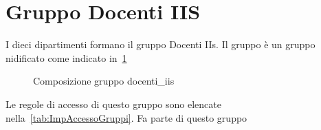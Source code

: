 \section{Gruppo Docenti IIS}
I dieci dipartimenti formano il gruppo Docenti IIs. Il gruppo è un gruppo nidificato come indicato in~\cref{fig:verticalidocenti}
\begin{figure}
	\centering
	
	\caption{Composizione gruppo docenti\_iis}
	\label{fig:verticalidocenti}
\end{figure}
Le  regole di accesso di questo gruppo sono elencate nella~\cref{tab:ImpAccessoGruppi}. Fa parte di questo gruppo 
